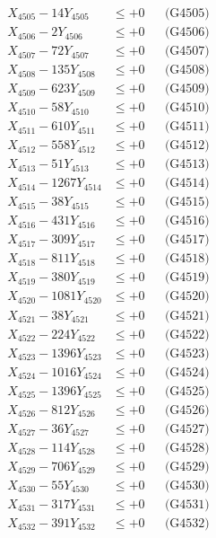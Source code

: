 \documentclass[a4paper,10pt]{article}
\begin{document}
{\begin{align}
X_{4505} - 14Y_{4505} &\leq +0 && \text{(G4505)} \\
X_{4506} - 2Y_{4506} &\leq +0 && \text{(G4506)} \\
X_{4507} - 72Y_{4507} &\leq +0 && \text{(G4507)} \\
X_{4508} - 135Y_{4508} &\leq +0 && \text{(G4508)} \\
X_{4509} - 623Y_{4509} &\leq +0 && \text{(G4509)} \\
X_{4510} - 58Y_{4510} &\leq +0 && \text{(G4510)} \\
\allowbreak
X_{4511} - 610Y_{4511} &\leq +0 && \text{(G4511)} \\
X_{4512} - 558Y_{4512} &\leq +0 && \text{(G4512)} \\
X_{4513} - 51Y_{4513} &\leq +0 && \text{(G4513)} \\
X_{4514} - 1267Y_{4514} &\leq +0 && \text{(G4514)} \\
X_{4515} - 38Y_{4515} &\leq +0 && \text{(G4515)} \\
X_{4516} - 431Y_{4516} &\leq +0 && \text{(G4516)} \\
X_{4517} - 309Y_{4517} &\leq +0 && \text{(G4517)} \\
X_{4518} - 811Y_{4518} &\leq +0 && \text{(G4518)} \\
X_{4519} - 380Y_{4519} &\leq +0 && \text{(G4519)} \\
X_{4520} - 1081Y_{4520} &\leq +0 && \text{(G4520)} \\
\allowbreak
X_{4521} - 38Y_{4521} &\leq +0 && \text{(G4521)} \\
X_{4522} - 224Y_{4522} &\leq +0 && \text{(G4522)} \\
X_{4523} - 1396Y_{4523} &\leq +0 && \text{(G4523)} \\
X_{4524} - 1016Y_{4524} &\leq +0 && \text{(G4524)} \\
X_{4525} - 1396Y_{4525} &\leq +0 && \text{(G4525)} \\
X_{4526} - 812Y_{4526} &\leq +0 && \text{(G4526)} \\
X_{4527} - 36Y_{4527} &\leq +0 && \text{(G4527)} \\
X_{4528} - 114Y_{4528} &\leq +0 && \text{(G4528)} \\
X_{4529} - 706Y_{4529} &\leq +0 && \text{(G4529)} \\
X_{4530} - 55Y_{4530} &\leq +0 && \text{(G4530)} \\
\allowbreak
X_{4531} - 317Y_{4531} &\leq +0 && \text{(G4531)} \\
X_{4532} - 391Y_{4532} &\leq +0 && \text{(G4532)} \\

\end{align}}
\end{document}
